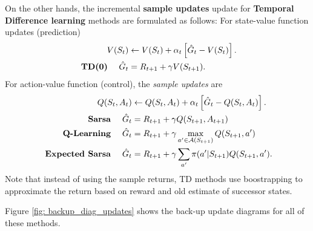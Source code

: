 \documentclass[11pt]{article}
\begin{document}
\begin{itemize}
On the other hands, the incremental  \textbf{sample updates} update for \textbf{Temporal Difference learning} methods are formulated as follows:  
For state-value function updates (prediction)
\begin{align*}
V(S_{t}) &\leftarrow V(S_{t}) + \alpha_{t}\left[\hat{G}_{t}  -  V(S_{t})\right]. \\
 \text{  \textbf{TD(0)} }\quad\hat{G}_{t} &= R_{t+1} + \gamma V(S_{t+1}).
\end{align*} For action-value function (control), the \emph{sample updates} are
\begin{align*}
Q(S_{t}, A_{t}) &\leftarrow Q(S_{t}, A_{t}) + \alpha_{t}\left[\hat{G}_{t}  - Q(S_{t}, A_{t})\right].  \\
 \text{  \textbf{Sarsa} }\quad\hat{G}_{t} &= R_{t+1} + \gamma Q(S_{t+1}, A_{t+1}) \\
\text{  \textbf{Q-Learning} }\quad\hat{G}_{t} &=  R_{t+1} + \gamma \max_{a'\in {\mathcal A}(S_{t+1})}Q(S_{t+1}, a')  \\
 \text{  \textbf{Expected Sarsa} }\quad\hat{G}_{t} &= R_{t+1} + \gamma\sum_{a'}\pi(a'|S_{t+1})Q(S_{t+1}, a') .
\end{align*} Note that instead of using the sample returns, TD methods use boostrapping to approximate the return based on reward and old estimate of successor states. 
\end{itemize} Figure \ref{fig: backup_diag_updates} shows the back-up update diagrams for all of these methods.  
\end{document}
